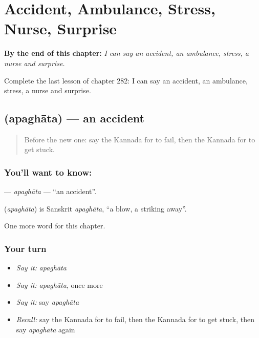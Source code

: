 
\chapter{Accident, Ambulance, Stress, Nurse, Surprise}
\label{ch:ka-accident-ambulance-stress-nurse-surprise}

\begin{chapteropening}
\textbf{By the end of this chapter:} \emph{I can say an accident, an ambulance, stress, a nurse and surprise.}

Complete the last lesson of chapter 282: I can say an accident, an ambulance, stress, a nurse and surprise.
\end{chapteropening}

\section[\texorpdfstring{\kn{ಅಪಘಾತ} (apaghāta)}{ಅಪಘಾತ (apaghāta)}]{ (apaghāta) — an accident}

\label{lesson:KA-C282-apaghata}



\begin{quote}
Before the new one: say the Kannada for to fail, then the Kannada for to get stuck.
\end{quote}

\subsection*{You'll want to know: }
\textbf{} — \emph{apaghāta} — \textquotedblleft{}an accident\textquotedblright{}.

\begin{cousinweb}
\textbf{} (\emph{apaghāta}) is Sanskrit \emph{apaghāta}, \textquotedblleft{}a blow, a striking away\textquotedblright{}.
\end{cousinweb}

\begin{grammarlens}[title={What you've built}]
One more word for this chapter.
\end{grammarlens}

\subsection*{Your turn}
\begin{itemize}
\raggedright
  \item \emph{Say it:} \emph{apaghāta}
  \item \emph{Say it:} \emph{apaghāta}, once more
  \item \emph{Say it:} say \emph{apaghāta}
  \item \emph{Recall:} say the Kannada for to fail, then the Kannada for to get stuck, then say \emph{apaghāta} again
\end{itemize}

